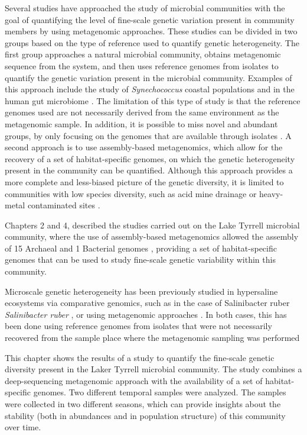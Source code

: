 Several studies have approached the study of microbial communities with the goal of quantifying the level of fine-scale genetic variation present in community members \cite{Wilmes:2009bn} by using metagenomic approaches. These studies can be divided in two groups based on the type of reference used to quantify genetic heterogeneity. The first group approaches a natural microbial community, obtains metagenomic sequence from the system, and then uses reference genomes from isolates to quantify the genetic variation present in the microbial community. Examples of this approach include the study of \textit{Synechococcus} coastal populations \cite{Tai:2011jo} and in the human gut microbiome \cite{Schloissnig:2012hx}. The limitation of this type of study is that the reference genomes used are not necessarily derived from the same environment as the metagenomic sample. In addition, it is possible to miss novel and abundant groups, by only focusing on the genomes that are available through isolates \cite{Podell:2013kx,Herlemann:uy}. A second approach is to use assembly-based metagenomics, which allow for the recovery of a set of habitat-specific genomes, on which the genetic heterogeneity present in the community can be quantified. Although this approach provides a more complete and less-biased picture of the genetic diversity, it is limited to communities with low species diversity, such as acid mine drainage  \cite{Allen:2007ju} or heavy-metal contaminated sites \cite{Hemme:2010ds}.

Chapters 2 and 4, described the studies carried out on the Lake Tyrrell microbial community, where the use of assembly-based metagenomics allowed the assembly of 15 Archaeal and 1 Bacterial genomes \cite{Narasingarao:2012kp,Podell:2013kx,Podell:2013fp}, providing a set of habitat-specific genomes that can be used to study fine-scale genetic variability within this community.

Microscale genetic heterogeneity has been previously studied in hypersaline ecosystems via comparative genomics, such as in the case of Salinibacter ruber \textit{Salinibacter ruber} \cite{PeNtildeA:2010ie}, or using metagenomic approaches \cite{Legault:2006kh,Pasic:2009bo}. In both cases, this has been done using reference genomes from isolates that were not necessarily recovered from the sample place where the metagenomic sampling was performed 

This chapter shows the results of a study to quantify the fine-scale genetic diversity present in the Laker Tyrrell microbial community. The study combines a deep-sequencing metagenomic approach with the availability of a set of habitat-specific genomes. Two different temporal samples were analyzed. The samples were collected in two different seasons, which can provide insights about the stability (both in abundances and in population structure) of this community over time.


